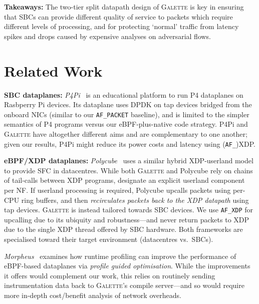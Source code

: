 \documentclass[comsoc, conference, times]{IEEEtran}
\newcommand{\ourtech}{\textsc{Galette}}
\newcommand{\afxdp}{\texttt{AF\_XDP}}
\newcommand{\af}{(\texttt{AF\_})XDP}
\newcommand{\afp}{\texttt{AF\_PACKET}}
\newcommand{\fakepara}[1]{\noindent\textbf{#1:}}
\begin{document}
\fakepara{Takeaways}
The two-tier split datapath design of \ourtech{} is key in ensuring that SBCs can provide different quality of service to packets which require different levels of processing, and for protecting `normal' traffic from latency spikes and drops caused by expensive analyses on adversarial flows.

\section{Related Work}\label{sec:related}

\fakepara{SBC dataplanes}
\emph{P4Pi}~\parencite{DBLP:journals/ccr/LakiSKSVZ21} is an educational platform to run P4 dataplanes on Rasbperry Pi devices.
Its dataplane uses DPDK on tap devices bridged from the onboard NICs (similar to our \afp{} baseline), and is limited to the simpler semantics of P4 programs versus our eBPF-plus-native code strategy.
P4Pi and \ourtech{} have altogether different aims and are complementary to one another; given our results, P4Pi might reduce its power costs and latency using \af{}.

\fakepara{eBPF/XDP dataplanes}
\emph{Polycube}~\parencite{DBLP:journals/tnsm/MianoRBBL21} uses a similar hybrid XDP-userland model to provide SFC in datacentres.
While both \ourtech{} and Polycube rely on chains of tail-calls between XDP programs, \citeauthor{DBLP:journals/tnsm/MianoRBBL21} designate an explicit userland component per NF.
If userland processing is required, Polycube upcalls packets using per-CPU ring buffers, and then \emph{recirculates packets back to the XDP datapath} using tap devices.
\ourtech{} is instead tailored towards SBC devices.
We use \afxdp{} for upcalling due to its ubiquity and robustness---and never return packets to XDP due to the single XDP thread offered by SBC hardware.
Both frameworks are specialised toward their target environment (datacentres vs.\ SBCs).

\emph{Morpheus}~\parencite{DBLP:conf/asplos/MianoSRRA22} examines how runtime profiling can improve the performance of eBPF-based dataplanes via \emph{profile guided optimisation}.
While the improvements it offers would complement our work, this relies on routinely sending instrumentation data back to \ourtech{}'s compile server---and so would require more in-depth cost/benefit analysis of network overheads.

%
\end{document}
